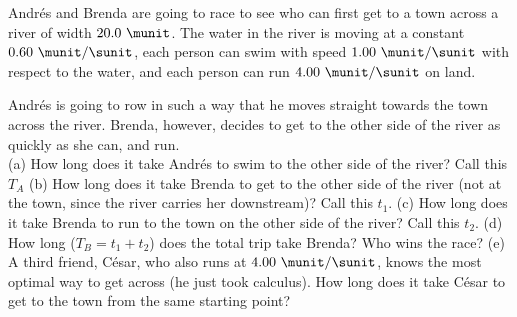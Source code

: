 Andr\'es and Brenda are going to race to see who can first get to a
town across a river of width $20.0\ \munit$. The water in the river is
moving at a constant $0.60\ \munit/\sunit$, each person can swim with
speed $1.00\ \munit/\sunit$ with respect to the water, and each
person can run $4.00\ \munit/\sunit$ on land.

Andr\'es is going to row in such a way that he moves straight towards
the town across the river. Brenda, however, decides to get to the
other side of the river as quickly as she can, and run.\\
%
(a) How long does it take Andr\'es to swim to the other side of the
river? Call this $T_A$\answercheck\hwendpart
%
(b) How long does it take Brenda to get to the other side of the river
(not at the town, since the river carries her downstream)? Call this
$t_1$.\answercheck\hwendpart
%
(c) How long does it take Brenda to run to the town on the other side
of the river? Call this $t_2$.\answercheck\hwendpart
%
(d) How long ($T_B = t_1 + t_2$) does the total trip take Brenda? Who
wins the race?\answercheck\hwendpart
%
(e) A third friend, C\'esar, who also runs at $4.00\ \munit/\sunit$,
knows the most optimal way to get across (he just took calculus). How
long does it take C\'esar to get to the town from the same starting
point?\answercheck
